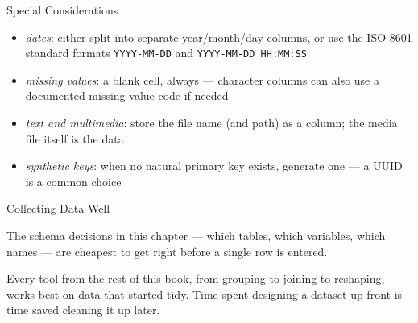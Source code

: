 \documentclass[8pt,aspectratio=169]{beamer}
\begin{document}
\begin{textframe}{Special Considerations}

\begin{itemize}
\item \textit{dates}: either split into separate year/month/day columns, or use the ISO 8601 standard formats \texttt{YYYY-MM-DD} and \texttt{YYYY-MM-DD HH:MM:SS}
\item \textit{missing values}: a blank cell, always --- character columns can also use a documented missing-value code if needed
\item \textit{text and multimedia}: store the file name (and path) as a column; the media file itself is the data
\item \textit{synthetic keys}: when no natural primary key exists, generate one --- a UUID is a common choice
\end{itemize}

\end{textframe}

\begin{textframe}{Collecting Data Well}

The schema decisions in this chapter --- which tables, which variables, which names --- are cheapest to get right before a single row is entered.

Every tool from the rest of this book, from grouping to joining to reshaping, works best on data that started tidy. Time spent designing a dataset up front is time saved cleaning it up later.

\end{textframe}
\end{document}

